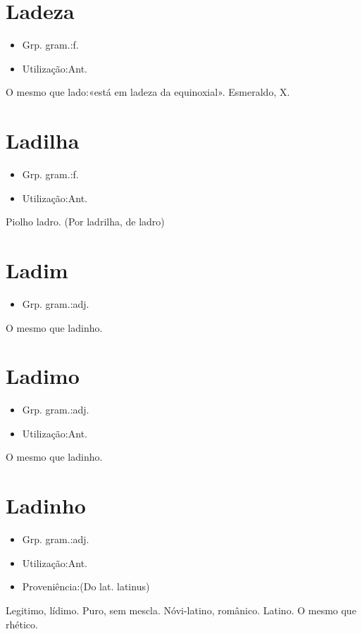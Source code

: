\section{Ladeza}
\begin{itemize}
\item {Grp. gram.:f.}
\end{itemize}
\begin{itemize}
\item {Utilização:Ant.}
\end{itemize}
O mesmo que \textunderscore lado\textunderscore :«\textunderscore está em ladeza da equinoxial\textunderscore ». Esmeraldo, X.
\section{Ladilha}
\begin{itemize}
\item {Grp. gram.:f.}
\end{itemize}
\begin{itemize}
\item {Utilização:Ant.}
\end{itemize}
Piolho ladro.
(Por \textunderscore ladrilha\textunderscore , de \textunderscore ladro\textunderscore )
\section{Ladim}
\begin{itemize}
\item {Grp. gram.:adj.}
\end{itemize}
O mesmo que \textunderscore ladinho\textunderscore .
\section{Ladimo}
\begin{itemize}
\item {Grp. gram.:adj.}
\end{itemize}
\begin{itemize}
\item {Utilização:Ant.}
\end{itemize}
O mesmo que \textunderscore ladinho\textunderscore .
\section{Ladinho}
\begin{itemize}
\item {Grp. gram.:adj.}
\end{itemize}
\begin{itemize}
\item {Utilização:Ant.}
\end{itemize}
\begin{itemize}
\item {Proveniência:(Do lat. \textunderscore latinus\textunderscore )}
\end{itemize}
Legitimo, lídimo.
Puro, sem mescla.
Nóvi-latino, românico.
Latino.
O mesmo que \textunderscore rhético\textunderscore .
